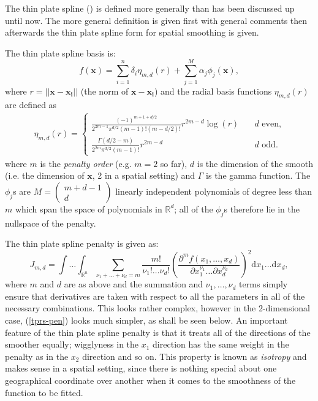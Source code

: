 The thin plate spline (\cite{duchon77}) is defined more generally than has been discussed up until now. The more general definition is given first with general comments then afterwards the thin plate spline form for spatial smoothing is given. 

The thin plate spline basis is:
\begin{equation}
f(\mathbf{x}) = \sum_{i=1}^n \delta_i \eta_{m,d}(r) + \sum_{j=1}^M \alpha_j \phi_j(\mathbf{x}),
\label{tprs-basis} 
\end{equation}
where $r=\lvert \lvert \mathbf{x}-\mathbf{x_i}\rvert \rvert$ (the norm of $ \mathbf{x}-\mathbf{x_i}$) and the radial basis functions $\eta_{m,d}(r)$ are defined as
\begin{align*}
\eta_{m,d}(r) =\begin{cases} \frac{(-1)^{m+1+d/2}}{2^{2m-1}\pi^{d/2}(m-1)!(m-d/2)!} r^{2m-d} \log(r) &\quad{\text{$d$ even,}}\\
\frac{\Gamma(d/2-m)}{2^{2m}\pi^{d/2}(m-1)!} r^{2m-d} &\quad{\text{$d$ odd.}}
\end{cases}
\end{align*}
where $m$ is the \textit{penalty order} (e.g. $m=2$ so far), $d$ is the dimension of the smooth (i.e. the dimension of $\mathbf{x}$, 2 in a spatial setting) and $\Gamma$ is the gamma function. The $\phi_j$s are $M=\left( \begin{smallmatrix} m+d-1 \\ d  \end{smallmatrix}\right)$ linearly independent polynomials of degree less than $m$ which span the space of polynomials in $\mathbb{R}^d$; all of the $\phi_j$s therefore lie in the nullspace of the penalty.

The thin plate spline penalty is given as:
\begin{equation}
J_{m,d} = \int \ldots \int_{\mathbb{R}^n} \sum_{\nu_1 + \dots + \nu_d=m} \frac{m!}{\nu_1! \dots \nu_d!} \left ( \frac{\partial^m f(x_1,\dots,x_d)}{\partial x_1^{\nu_1} \ldots  \partial x_d^{\nu_d}} \right )^2 \text{d} x_1 \ldots  \text{d} x_d,
\label{tprs-pen}
\end{equation}
where $m$ and $d$ are as above and the summation and $\nu_1,\ldots,\nu_d$ terms simply ensure that derivatives are taken with respect to all the parameters in all of the necessary combinations. This looks rather complex, however in the 2-dimensional case, (\ref{tprs-pen}) looks much simpler, as shall be seen below. An important feature of the thin plate spline penalty is that it treats all of the directions of the smoother equally; wigglyness in the $x_1$ direction has the same weight in the penalty as in the $x_2$ direction and so on. This property is known as \textit{isotropy} and makes sense in a spatial setting, since there is nothing special about one geographical coordinate over another when it comes to the smoothness of the function to be fitted.

